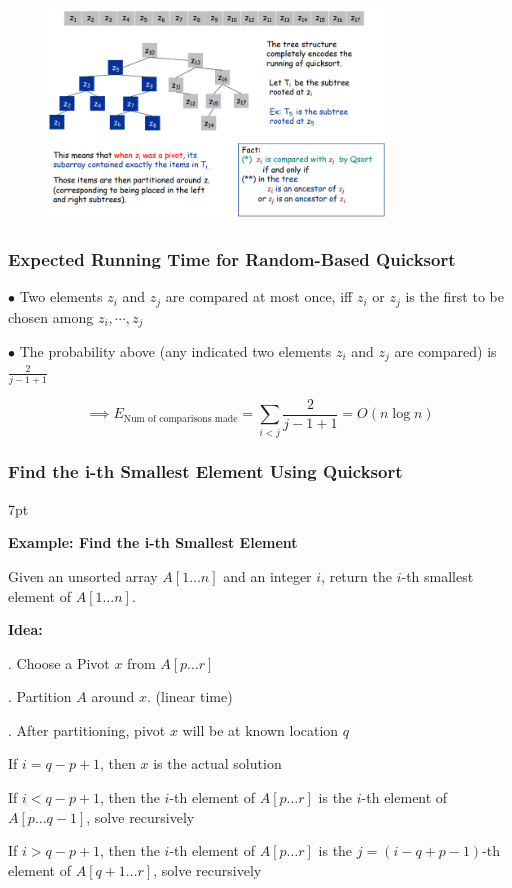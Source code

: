 \documentclass[10pt]{article}
\newenvironment{formal}[2]{%
	\def\FrameCommand{%
		\hspace{1pt}%
		{\color{#1}\vrule width 2pt}%
		{\color{#2}\vrule width 4pt}%
		\colorbox{#2}%
	}%
	\MakeFramed{\advance\hsize-\width\FrameRestore}%
	\noindent\hspace{-4.55pt}%
	\begin{adjustwidth}{}{7pt}%
		\vspace{2pt}\vspace{2pt}%
	}
	{%
		\vspace{2pt}\end{adjustwidth}\endMakeFramed%
}
\begin{document}
\begin{figure}[h]
	\centering
	\includegraphics[width=0.8\textwidth]{img4-1}
\end{figure}

\subsubsection{Expected Running Time for Random-Based Quicksort} 

$\bullet$ Two elements $z_i$ and $z_j$ are compared at most once, iff $z_i$ or $z_j$ is the first to be chosen among $z_i, \cdots, z_j$

$\bullet$ The probability above (any indicated two elements $z_i$ and $z_j$ are compared) is $\frac{2}{j-1+1}$

$$
\implies E_{\text{Num of comparisons made}} = \sum_{i<j} \frac{2}{j-1+1} = O(n\log n)
$$

\subsubsection{Find the i-th Smallest Element Using Quicksort}

\begin{formal}{Brown}{brownshade}
	
	\textbf{Example: Find the i-th Smallest Element}
	
	Given an unsorted array $A[1\dots n]$ and an integer $i$, return the $i$-th smallest element of $A[1\dots n]$.
	
\vspace*{1em}

\noindent \textbf{Idea:}

. Choose a Pivot $x$ from $A[p\dots r]$

. Partition $A$ around $x$. (linear time)

. After partitioning, pivot $x$ will be at known location $q$

If $i = q-p+1$, then $x$ is the actual solution

If $i < q-p+1$, then the $i$-th element of $A[p\dots r]$ is the $i$-th element of $A[p\dots q-1]$, solve recursively

If $i > q-p+1$, then the $i$-th element of $A[p\dots r]$ is the $j = (i-q+p-1)$-th element of $A[q+1\dots r]$, solve recursively

\end{formal}
\end{document}
